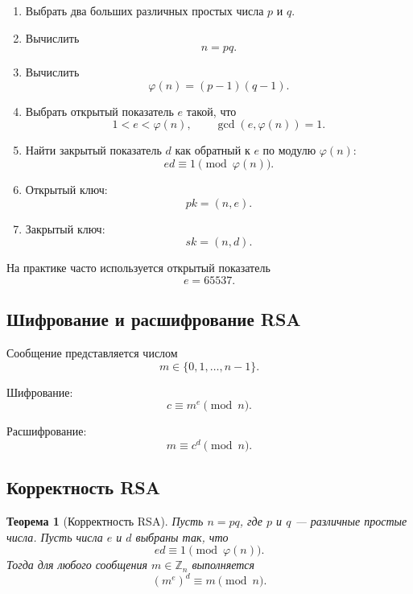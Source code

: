 \documentclass[12pt,a4paper]{article}
\newtheorem{theorem}{Теорема}
\begin{document}
\begin{enumerate}
    \item Выбрать два больших различных простых числа $p$ и $q$.
    \item Вычислить
    \[
        n=pq.
    \]
    \item Вычислить
    \[
        \varphi(n)=(p-1)(q-1).
    \]
    \item Выбрать открытый показатель $e$ такой, что
    \[
        1<e<\varphi(n),\qquad \gcd(e,\varphi(n))=1.
    \]
    \item Найти закрытый показатель $d$ как обратный к $e$ по модулю $\varphi(n)$:
    \[
        ed\equiv 1 \pmod{\varphi(n)}.
    \]
    \item Открытый ключ:
    \[
        pk=(n,e).
    \]
    \item Закрытый ключ:
    \[
        sk=(n,d).
    \]
\end{enumerate}

На практике часто используется открытый показатель
\[
    e=65537.
\]

\subsection{Шифрование и расшифрование RSA}

Сообщение представляется числом
\[
    m\in \{0,1,\ldots,n-1\}.
\]

Шифрование:
\[
    c \equiv m^e \pmod n.
\]

Расшифрование:
\[
    m \equiv c^d \pmod n.
\]

\subsection{Корректность RSA}

\begin{theorem}[Корректность RSA]
Пусть $n=pq$, где $p$ и $q$ --- различные простые числа. Пусть числа $e$ и $d$ выбраны так, что
\[
    ed\equiv 1 \pmod{\varphi(n)}.
\]
Тогда для любого сообщения $m\in \mathbb{Z}_n$ выполняется
\[
    (m^e)^d \equiv m \pmod n.
\]
\end{theorem}
\end{document}
